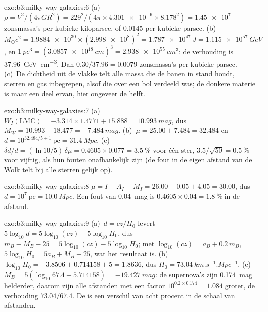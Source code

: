 \begin{solution}{exo:b3:milky-way-galaxies:6}
(a)~$\rho = V^2/(4\pi GR^2) = 229^2/(4\pi\times\num{4.301e-6}\times
8.178^2) = \num{1.45e7}$ zonsmassa's per kubieke kiloparsec, of
\num{0.0145} per kubieke parsec. (b)~$M_\odot c^2 = \num{1.9884e30}\times
(\num{2.998e8})^2 = \qty{1.787e47}{J} = \qty{1.115e57}{GeV}$, en
$\qty{1}{pc^3} = (\qty{3.0857e18}{cm})^3 = \qty{2.938e55}{cm^3}$: de
verhouding is \qty{37.96}{GeV.cm^{-3}}. Dan $0.30/37.96 = \num{0.0079}$
zonsmassa's per kubieke parsec. (c)~De dichtheid uit de vlakke  telt alle massa die
de banen in stand houdt, sterren en gas inbegrepen, alsof die over een
bol verdeeld was; de donkere materie is maar een deel ervan, hier ongeveer de helft.
\end{solution}

\begin{solution}{exo:b3:milky-way-galaxies:7}
(a)~$W_I(\mathrm{LMC}) = -3.314\times1.4771 + 15.888 = \qty{10.993}{mag}$,
dus $M_W = 10.993 - 18.477 = \qty{-7.484}{mag}$. (b)~$\mu = 25.00 + 7.484 =
32.484$ en $d = 10^{32.484/5 + 1}~\mathrm{pc} = \qty{31.4}{Mpc}$.
(c)~$\delta d/d = (\ln 10/5)\,\delta\mu = 0.4605\times0.077 =
\qty{3.5}{\percent}$ voor één ster, $3.5/\sqrt{50} = \qty{0.5}{\percent}$
voor vijftig, als hun fouten onafhankelijk zijn (de fout in de eigen
afstand van de Wolk telt bij alle sterren gelijk op).
\end{solution}

\begin{solution}{exo:b3:milky-way-galaxies:8}
$\mu = I - A_I - M_I = 26.00 - 0.05 + 4.05 = 30.00$, dus $d =
10^{7}~\mathrm{pc} = \qty{10.0}{Mpc}$. Een fout van \qty{0.04}{mag} is
$0.4605\times0.04 = \qty{1.8}{\percent}$ in de afstand.
\end{solution}

\begin{solution}{exo:b3:milky-way-galaxies:9}
(a)~$d = cz/H_0$ levert $5\log_{10}d = 5\log_{10}(cz) - 5\log_{10}H_0$,
dus $m_B - M_B - 25 = 5\log_{10}(cz) - 5\log_{10}H_0$; met
$\log_{10}(cz) = a_B + 0.2\,m_B$, $5\log_{10}H_0 = 5a_B + M_B + 25$, wat
het resultaat is. (b)~$\log_{10}H_0 = -3.8506 + 0.714158 + 5 = 1.8636$, dus
$H_0 = \qty{73.04}{km.s^{-1}.Mpc^{-1}}$. (c)~$M_B = 5(\log_{10}67.4 -
5.714158) = \qty{-19.427}{mag}$: de supernova's zijn \qty{0.174}{mag} helderder,
daarom zijn alle afstanden met een factor $10^{0.2\times0.174} = 1.084$ groter, de
verhouding $73.04/67.4$. De  is een verschil van acht procent in de
schaal van afstanden.
\end{solution}

